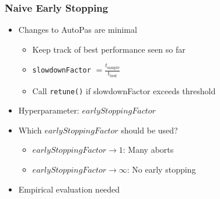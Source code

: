 \documentclass[
	10pt,
	t		%
]{beamer}
\begin{document}
\begin{frame}
    \frametitle{Naive Early Stopping}

    \begin{itemize}
        \item Changes to AutoPas are minimal
              \begin{itemize}
                  \item Keep track of best performance seen so far
                  \item \texttt{slowdownFactor} $= \frac{t_{\text{sample}}}{t_{\text{best}}}$
                  \item Call \texttt{retune()} if slowdownFactor exceeds threshold
              \end{itemize}


        \item Hyperparameter: $earlyStoppingFactor$

        \item Which $earlyStoppingFactor$ should be used?
              \begin{itemize}
                  \item $earlyStoppingFactor \rightarrow 1$: Many aborts
                  \item $earlyStoppingFactor \rightarrow \infty$: No early stopping
              \end{itemize}

        \item Empirical evaluation needed
    \end{itemize}
\end{frame}
\end{document}

